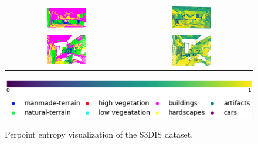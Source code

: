 \begin{figure}[h!]
\begin{tabular}{cc}
            \includegraphics[width=0.33\textwidth, height=0.18\textheight]{images/seg_output/s3dis_DE/S3DIS_3_Pred.pdf}& 
            \includegraphics[width=0.33\textwidth, height=0.18\textheight]{images/seg_output/flipout/ent_de_s3dis_2.pdf}\\

            \includegraphics[width=0.33\textwidth, height=0.18\textheight]{images/seg_output/s3dis_DE/S3DIS_4_Pred.pdf}& 
            \includegraphics[width=0.33\textwidth, height=0.18\textheight]{images/seg_output/flipout/ent_de_s3dis_4.pdf}\\
        \end{tabular}
        \includegraphics[scale=0.45]{images/prob_legend.pdf}
        \includegraphics[scale=0.65]{images/legend.png}
        \caption{Perpoint entropy visualization of the S3DIS dataset.}
        \label{fig:de_s3dis_entmap}
    \end{figure}

